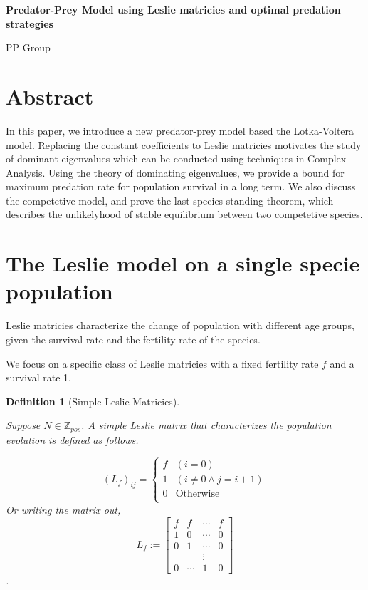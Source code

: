 \documentclass{article}
\newtheorem{definition}{Definition}
\begin{document}
\begin{center}
    \Large
    \textbf{Predator-Prey Model using Leslie matricies and optimal predation strategies}

    \large
    PP Group
\end{center}

\section{Abstract}

In this paper, we introduce a new predator-prey model based 
the Lotka-Voltera model. Replacing the constant coefficients to 
Leslie matricies motivates the study of dominant eigenvalues 
which can be conducted using techniques in Complex Analysis. 
Using the theory of dominating eigenvalues, we provide a bound 
for maximum predation rate for population survival in a long term. 
We also discuss the competetive model, and prove the 
last species standing theorem, which describes the unlikelyhood 
of stable equilibrium between two competetive species. 

\section{The Leslie model on a single specie population}

Leslie matricies characterize the change of population with 
different age groups, given the survival rate and the fertility rate 
of the species. 


We focus on a specific class of Leslie matricies with 
a fixed fertility rate $f$ and a survival rate 1. 

\begin{definition}[Simple Leslie Matricies]
    \label{LeslieDef}

    Suppose $N \in \mathbb{Z}_{pos}$. A simple Leslie matrix that 
    characterizes the population evolution is defined as follows. 

    \[
        (L_f)_{ij} = \begin{cases}
            f & (i = 0)\\
            1 & (i \neq 0 \wedge j=i+1)\\
            0 & \textrm{Otherwise}\\
        \end{cases}
    \]
        Or writing the matrix out, 
    \[L_f :=
    \begin{bmatrix}
        f & f& \cdots & f \\ 
        1 & 0 & \cdots & 0 \\
        0 & 1 & \cdots & 0\\
        &&\vdots &\\
        0 & \cdots & 1 & 0
    \end{bmatrix} 
    \]. 
\end{definition}
\end{document}
